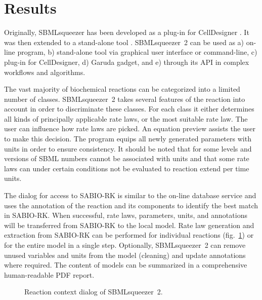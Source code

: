 \documentclass{bioinfo}
\begin{document}
\vspace{-.1cm}
\section{Results}

Originally, SBMLsqueezer has been developed as a plug-in for CellDesigner \citep{Draeger2008}.
It was then extended to a %
stand-alone tool \citep{Draeger2010}.
SBMLsqueezer~2 can be used as
a) on-line program,
b) stand-alone tool via graphical user interface or command-line,
c) plug-in for CellDesigner,
d) Garuda gadget, and
e) through its API in complex workflows and algorithms.

The vast majority of biochemical reactions can be categorized into a limited number of classes.
SBMLsqueezer~2 takes several features of the reaction into account in order to discriminate these classes.
For each class it either determines all kinds of principally applicable rate laws, or the most suitable rate law.
The user can influence how rate laws are picked.
An equation preview assists the user to make this decision.
The program equips all newly generated parameters with units in order to ensure consistency.
It should be noted that for some levels and versions of SBML numbers cannot be associated with units and that some rate laws can under certain conditions not be evaluated to reaction extend per time units.

The dialog for access to SABIO-RK is similar to %
the on-line database service and %
uses the annotation of the reaction and its components to identify the best match in SABIO-RK.
When successful, rate laws, parameters, units, and annotations will be transferred from SABIO-RK to the local model.
%
Rate law generation and extraction from SABIO-RK can be performed for individual reactions (fig.~\ref{fig:SBMLsqueezer}) or for the entire model in a single step.
Optionally, SBMLsqueezer~2 can remove unused variables and units from the model (cleaning) and update annotations where required.
The content of models can be summarized in a comprehensive human-readable PDF report.

\begin{figure}
\caption[Reaction context dialog of SBMLsqueezer~2]{Reaction context dialog of SBMLsqueezer~2.}\label{fig:SBMLsqueezer}
\vspace{-.2cm}
\end{figure}
\end{document}
